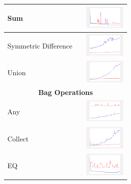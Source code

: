 \begin{longtable}{ m{2.5cm} m{8cm} m{2cm} }
Sum &

&
\includegraphics[width=2cm]{../graphs/set/small/Sum}
\\\hline

Symmetric Difference &

&
\includegraphics[width=2cm]{../graphs/set/small/SymmetricDif}
\\\hline

Union &

&
\includegraphics[width=2cm]{../graphs/set/small/Union}
\\\hline

 \multicolumn{3}{c}{{\bf Bag Operations}}\\\hline
 
 Any &
  
  & 
  	\includegraphics[width=2cm]{../graphs/bag/small/Any}
  \\\hline
  
  Collect &

&
\includegraphics[width=2cm]{../graphs/bag/small/Collect}
\\\hline

EQ &

&
\includegraphics[width=2cm]{../graphs/bag/small/EQ}
\\\hline


\end{longtable}
